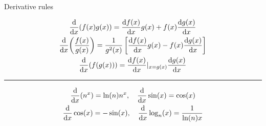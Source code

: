 \documentclass[../tufte-style.tex]{standalone}
\begin{document}
\begin{frame}{Derivative rules}

    \large

    \begin{gather*}
        \dv{x}\qty(f(x)g(x)) =  \dv{f(x)}{x}g(x) + f(x)\dv{g(x)}{x} \\
        \dv{x}\qty(\frac{f(x)}{g(x)}) = \frac{1}{g^2(x)}\left[ \dv{f(x)}{x}g(x) - f(x)\dv{g(x)}{x} \right] \\
        \dv{x}\qty(f(g(x))) = \dv{f(x)}{x}|_{x=g(x)}\dv{g(x)}{x}
    \end{gather*}


    \par\noindent\rule{\textwidth}{0.4pt}
   

    \begin{gather*}
        \dv{x}\qty(n^x) = \ln(n)n^x,\quad 
        \dv{x}\sin(x) = \cos(x) \\
        \dv{x}\cos(x) = -\sin(x),\quad
        \dv{x}\log_n(x) = \frac{1}{\ln(n)x}
    \end{gather*}

\end{frame}
\end{document}
